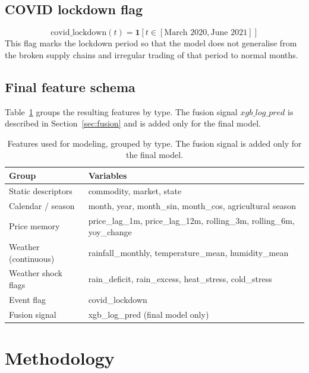 \documentclass[conference,twoside]{IEEEtran}
\begin{document}
\subsection{COVID lockdown flag}
\begin{equation}
\text{covid\_lockdown}(t) = \mathbf{1}\!\left[t \in [\text{March 2020}, \text{June 2021}]\right]
\label{eq:covid}
\end{equation}
This flag marks the lockdown period so that the model does not generalise from the broken supply chains and irregular trading of that period to normal months.

\subsection{Final feature schema}
Table~\ref{tab:features} groups the resulting features by type. The fusion signal $xgb\_log\_pred$ is described in Section~\ref{sec:fusion} and is added only for the final model.

\begin{table}[!t]
\centering
\caption{Features used for modeling, grouped by type. The fusion signal is added only for the final model.}
\label{tab:features}
\begin{tabular}{p{3.2cm}p{13.0cm}}
\toprule
\textbf{Group} & \textbf{Variables} \\
\midrule
Static descriptors  & commodity, market, state \\
Calendar / season   & month, year, month\_sin, month\_cos, agricultural season \\
Price memory        & price\_lag\_1m, price\_lag\_12m, rolling\_3m, rolling\_6m, yoy\_change \\
Weather (continuous)& rainfall\_monthly, temperature\_mean, humidity\_mean \\
Weather shock flags & rain\_deficit, rain\_excess, heat\_stress, cold\_stress \\
Event flag          & covid\_lockdown \\
Fusion signal       & xgb\_log\_pred (final model only) \\
\bottomrule
\end{tabular}
\end{table}

\section{Methodology}
\label{sec:methodology}
\end{document}

